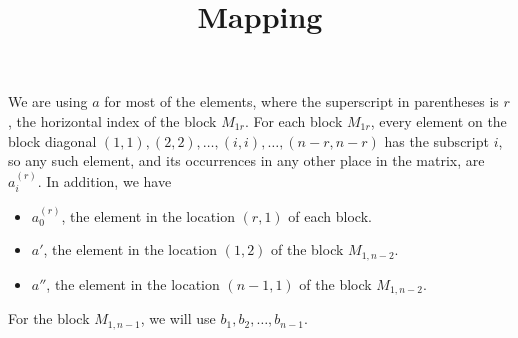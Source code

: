 \documentclass{article}
\title{Mapping}
\begin{document}
\maketitle
We are using $a$ for most of the elements, where the superscript in parentheses is $r$, the horizontal index of the block $M_{1r}$. For each block $M_{1r}$, every element on the block diagonal $(1,1),(2,2),\dots,(i,i),\dots,(n-r,n-r)$ has the subscript $i$, so any such element, and its occurrences in any other place in the matrix, are $a_{i}^{(r)}$. In addition, we have
\begin{itemize}
\item $a_{0}^{(r)}$, the element in the location $(r,1)$ of each block.
\item $a'$, the element in the location $(1,2)$ of the block $M_{1,n-2}$.
\item $a''$, the element in the location $(n-1,1)$ of the block $M_{1,n-2}$.
\end{itemize}
For the block $M_{1,n-1}$, we will use $b_1,b_2,\dots,b_{n-1}$.
\end{document}
